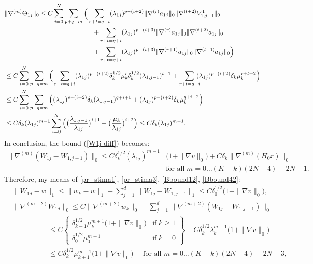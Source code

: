 \documentclass[reqno,twoside,11pt]{amsart}
\numberwithin{equation}{section}
\theoremstyle{plain}
\theoremstyle{definition}
\begin{document}
\begin{equation*}
\begin{split}
& \|\nabla^{(m)}\Theta_{1j}\|_0 
\leq C\sum_{i=0}^N \sum_{p+q=m} \Big(\sum_{r+t=q+i}(\lambda_{1j})^{p-(i+2)}
\|\nabla^{(r)}a_{1j}\|_0\| \nabla^{(t+2)}V_{1, j-1}^1\|_0 
\\ & \hspace{4.7cm} + \sum_{r+t=q+i} (\lambda_{1j})^{p-(i+3)}\|\nabla^{(r)}a_{1j}\|_0\| \nabla^{(t+2)}a_{1j}\|_0
\\ & \hspace{4.7cm} + \sum_{r+t=q+i}(\lambda_{1j})^{p-(i+3)}\|\nabla^{(r+1)}a_{1j} \|_0\|
\nabla^{(t+1)} a_{1j}\|_0 \Big)  
\\ & \leq C\sum_{i=0}^N \sum_{p+q=m} \Big(\sum_{r+t=q+i} (\lambda_{1j})^{p-(i+2)}\delta_k^{1/2}\mu_k^r
\delta_k^{1/2}(\lambda_{1,j-1})^{t+1} + \sum_{r+t=q+i} \hspace{-2mm} 
(\lambda_{1j})^{p-(i+2)}\delta_k\mu_k^{r+t+2}\Big)
\\ &\leq C\sum_{i=0}^N \sum_{p+q=m} \Big( (\lambda_{1j})^{p-(i+2)}\delta_k(\lambda_{1,j-1})^{q+i+1}
+ (\lambda_{1j})^{p-(i+2)}\delta_k\mu_k^{q+i+2}\Big) \\ & 
\leq C \delta_k (\lambda_{1j})^{m-1}\sum_{i=0}^N
\Big( \big(\frac{\lambda_{1,j-1}}{\lambda_{1j}}\big)^{i+1}
+ \big(\frac{\mu_k}{\lambda_{1j}}\big)^{i+2}\Big) \leq C \delta_k(\lambda_{1j})^{m-1}.
\end{split}
\end{equation*}
In conclusion, the bound (\ref{W1j-diff}) becomes:
\begin{equation*}
\begin{split}
\|\nabla^{(m)}(W_{1j}-W_{1,j-1})\|_0  \leq
C\delta_k^{1/2}(\lambda_{1j})^{m-1}&\big(1+ \|\nabla v\|_0\big) +
C\delta_k \|\nabla^{(m)}(H_0x)\|_0  \\ & \mbox{for all } m =0\ldots (K-k)(2N+4)-2N-1.
\end{split}
\end{equation*}
Therefore, my means of \ref{pr_stima1}, \ref{pr_stima3}, \ref{Bbound12}, \ref{Bbound42}:
\begin{equation}\label{fin2}
\begin{split}
& \|W_{1d}-w\|_1\leq \|w_k-w\|_1 +
\sum_{j=1}^d\|W_{1j}-W_{1,j-1}\|_1\leq C\delta_0^{1/2} \big(1+ \|\nabla v\|_0\big), \\
& \|\nabla^{(m+2)}W_{1d}\|_0 \leq C \|\nabla^{(m+2)}w_k\|_0 +
\sum_{j=1}^d \|\nabla^{(m+2)}(W_{1j}-W_{1,j-1})\|_0  \\ & \qquad
\qquad\quad 
\leq  C\left\{\begin{array}{ll}\delta_{k-1}^{1/2}\mu_k^{m+1}\big(1+ \|\nabla
    v\|_0\big) & \mbox{if } k\geq 1 \\ \delta_0^{1/2}\mu_0^{m+1} &
    \mbox{if } k=0\end{array}\right\} + 
C\delta_{k}^{1/2}\lambda_k^{m+1}\big(1+ \|\nabla v\|_0\big)
\\ & \qquad \qquad\quad \leq C \delta_{k}^{1/2}\mu_{k+1}^{m+1}\big(1+ \|\nabla v\|_0\big)
\quad \mbox{ for all } m=0\ldots (K-k)(2N+4)-2N-3,
\end{split}
\end{equation}
\end{document}
